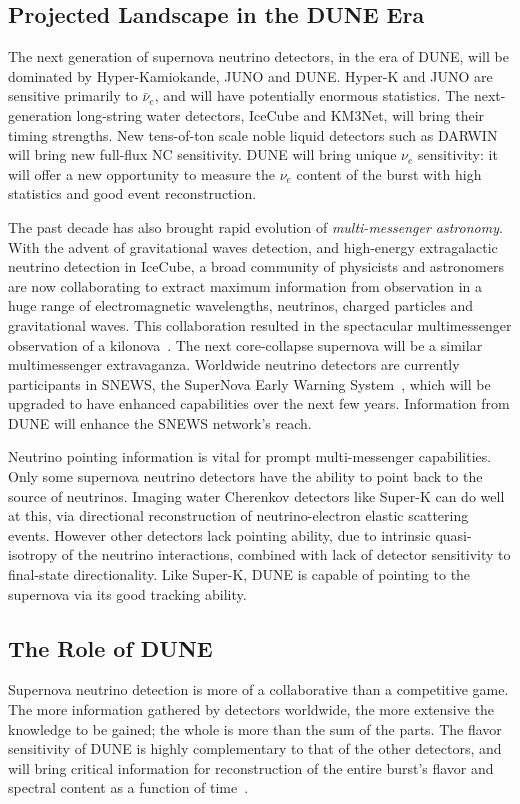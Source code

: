 \subsection{Projected Landscape in the DUNE Era}
The next generation of supernova neutrino detectors, in the era of
DUNE, will be dominated by Hyper-Kamiokande, JUNO and DUNE.  Hyper-K
and JUNO are sensitive primarily to $\bar{\nu}_e$, and will have
potentially enormous statistics.  The next-generation long-string
water detectors, IceCube and KM3Net, will bring their timing
strengths.   New tens-of-ton scale
noble liquid detectors such as DARWIN will bring new full-flux NC
sensitivity. 
DUNE will bring unique $\nu_e$ sensitivity: it will offer
a new opportunity to measure the $\nu_e$ content of the burst with
high statistics and good event reconstruction.

The past decade has also brought rapid evolution of
\textit{multi-messenger astronomy}.  With the advent of gravitational
waves detection, and high-energy extragalactic neutrino detection in
IceCube, a broad community of physicists and astronomers are now
collaborating to extract maximum information from observation in a
huge range of electromagnetic wavelengths, neutrinos, charged particles
and gravitational waves.  This collaboration resulted in the
spectacular multimessenger observation of a kilonova~\cite{kilonova}.  The
next core-collapse supernova will be a similar multimessenger
extravaganza.  Worldwide neutrino detectors are currently participants
in SNEWS, the SuperNova Early Warning System~\cite{snews}, which will be
upgraded to have enhanced capabilities over the next few
years.  Information from DUNE will enhance the SNEWS
network's reach.

Neutrino pointing information is vital for prompt multi-messenger
capabilities.  Only some supernova neutrino detectors have the ability
to point back to the source of neutrinos.  Imaging water Cherenkov
detectors like Super-K can do well at this, via directional
reconstruction of neutrino-electron elastic scattering events. However other detectors
lack pointing ability, due to intrinsic quasi-isotropy of the neutrino
interactions, combined with lack of detector sensitivity to
final-state directionality.  Like Super-K, DUNE is capable of pointing
to the supernova via its good tracking ability.

\subsection{The Role of DUNE}
Supernova neutrino detection is more of a collaborative than a
competitive game.  The more information gathered by detectors
worldwide, the more extensive the knowledge to be gained; the whole is
more than the sum of the parts.  The flavor sensitivity of DUNE is
highly complementary to that of the other detectors, and will bring
critical information for reconstruction of the entire burst's flavor and
spectral content as a function of time~\cite{Ankowski:2016lab}.

